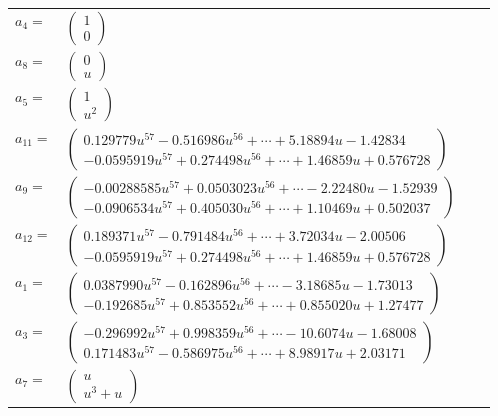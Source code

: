 \documentclass[1p]{elsarticle_modified}
\theoremstyle{definition}
\begin{document}
\begin{tabular}{m{7pt} m{180pt} m{7pt} m{180pt} }
\flushright $a_{4}=$&$\begin{pmatrix}1\\0\end{pmatrix}$ \\
\flushright $a_{8}=$&$\begin{pmatrix}0\\u\end{pmatrix}$ \\
\flushright $a_{5}=$&$\begin{pmatrix}1\\u^2\end{pmatrix}$ \\
\flushright $a_{11}=$&$\begin{pmatrix}0.129779 u^{57}-0.516986 u^{56}+\cdots+5.18894 u-1.42834\\-0.0595919 u^{57}+0.274498 u^{56}+\cdots+1.46859 u+0.576728\end{pmatrix}$ \\
\flushright $a_{9}=$&$\begin{pmatrix}-0.00288585 u^{57}+0.0503023 u^{56}+\cdots-2.22480 u-1.52939\\-0.0906534 u^{57}+0.405030 u^{56}+\cdots+1.10469 u+0.502037\end{pmatrix}$ \\
\flushright $a_{12}=$&$\begin{pmatrix}0.189371 u^{57}-0.791484 u^{56}+\cdots+3.72034 u-2.00506\\-0.0595919 u^{57}+0.274498 u^{56}+\cdots+1.46859 u+0.576728\end{pmatrix}$ \\
\flushright $a_{1}=$&$\begin{pmatrix}0.0387990 u^{57}-0.162896 u^{56}+\cdots-3.18685 u-1.73013\\-0.192685 u^{57}+0.853552 u^{56}+\cdots+0.855020 u+1.27477\end{pmatrix}$ \\
\flushright $a_{3}=$&$\begin{pmatrix}-0.296992 u^{57}+0.998359 u^{56}+\cdots-10.6074 u-1.68008\\0.171483 u^{57}-0.586975 u^{56}+\cdots+8.98917 u+2.03171\end{pmatrix}$ \\
\flushright $a_{7}=$&$\begin{pmatrix}u\\u^3+u\end{pmatrix}$ \\

\end{tabular}
\end{document}
